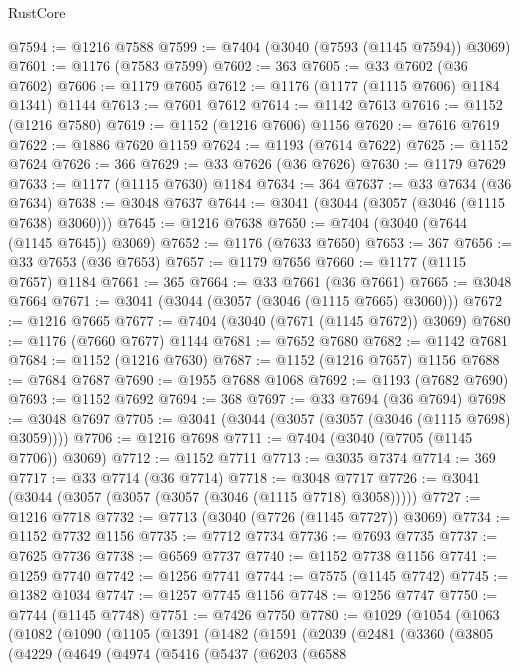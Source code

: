 \begin{lexlean}{RustCore}
\begin{coremodule}
@7594 := @1216 @7588
@7599 := @7404 (@3040 (@7593 (@1145 @7594)) @3069)
@7601 := @1176 (@7583 @7599)
@7602 := 363
@7605 := @33 @7602 (@36 @7602)
@7606 := @1179 @7605
@7612 := @1176 (@1177 (@1115 @7606) @1184 @1341) @1144
@7613 := @7601 @7612
@7614 := @1142 @7613
@7616 := @1152 (@1216 @7580)
@7619 := @1152 (@1216 @7606) @1156
@7620 := @7616 @7619
@7622 := @1886 @7620 @1159
@7624 := @1193 (@7614 @7622)
@7625 := @1152 @7624
@7626 := 366
@7629 := @33 @7626 (@36 @7626)
@7630 := @1179 @7629
@7633 := @1177 (@1115 @7630) @1184
@7634 := 364
@7637 := @33 @7634 (@36 @7634)
@7638 := @3048 @7637
@7644 := @3041 (@3044 (@3057 (@3046 (@1115 @7638) @3060)))
@7645 := @1216 @7638
@7650 := @7404 (@3040 (@7644 (@1145 @7645)) @3069)
@7652 := @1176 (@7633 @7650)
@7653 := 367
@7656 := @33 @7653 (@36 @7653)
@7657 := @1179 @7656
@7660 := @1177 (@1115 @7657) @1184
@7661 := 365
@7664 := @33 @7661 (@36 @7661)
@7665 := @3048 @7664
@7671 := @3041 (@3044 (@3057 (@3046 (@1115 @7665) @3060)))
@7672 := @1216 @7665
@7677 := @7404 (@3040 (@7671 (@1145 @7672)) @3069)
@7680 := @1176 (@7660 @7677) @1144
@7681 := @7652 @7680
@7682 := @1142 @7681
@7684 := @1152 (@1216 @7630)
@7687 := @1152 (@1216 @7657) @1156
@7688 := @7684 @7687
@7690 := @1955 @7688 @1068
@7692 := @1193 (@7682 @7690)
@7693 := @1152 @7692
@7694 := 368
@7697 := @33 @7694 (@36 @7694)
@7698 := @3048 @7697
@7705 := @3041 (@3044 (@3057 (@3057 (@3046 (@1115 @7698) @3059))))
@7706 := @1216 @7698
@7711 := @7404 (@3040 (@7705 (@1145 @7706)) @3069)
@7712 := @1152 @7711
@7713 := @3035 @7374
@7714 := 369
@7717 := @33 @7714 (@36 @7714)
@7718 := @3048 @7717
@7726 := @3041 (@3044 (@3057 (@3057 (@3057 (@3046 (@1115 @7718) @3058)))))
@7727 := @1216 @7718
@7732 := @7713 (@3040 (@7726 (@1145 @7727)) @3069)
@7734 := @1152 @7732 @1156
@7735 := @7712 @7734
@7736 := @7693 @7735
@7737 := @7625 @7736
@7738 := @6569 @7737
@7740 := @1152 @7738 @1156
@7741 := @1259 @7740
@7742 := @1256 @7741
@7744 := @7575 (@1145 @7742)
@7745 := @1382 @1034
@7747 := @1257 @7745 @1156
@7748 := @1256 @7747
@7750 := @7744 (@1145 @7748)
@7751 := @7426 @7750
@7780 := @1029
    (@1054
      (@1063
        (@1082
          (@1090
            (@1105
              (@1391
                (@1482
                  (@1591
                    (@2039
                      (@2481
                        (@3360
                          (@3805
                            (@4229
                              (@4649
                                (@4974
                                  (@5416
                                    (@5437
                                      (@6203
                                        (@6588

\end{coremodule}
\end{lexlean}
